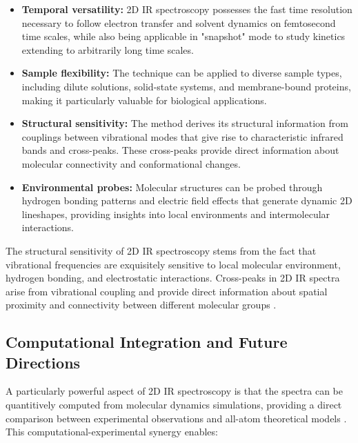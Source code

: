 \begin{itemize}
	\item \textbf{Temporal versatility:} 2D IR spectroscopy possesses the fast time resolution necessary to follow electron transfer and solvent dynamics on femtosecond time scales, while also being applicable in "snapshot" mode to study kinetics extending to arbitrarily long time scales.

	\item \textbf{Sample flexibility:} The technique can be applied to diverse sample types, including dilute solutions, solid-state systems, and membrane-bound proteins, making it particularly valuable for biological applications.

	\item \textbf{Structural sensitivity:} The method derives its structural information from couplings between vibrational modes that give rise to characteristic infrared bands and cross-peaks. These cross-peaks provide direct information about molecular connectivity and conformational changes.

	\item \textbf{Environmental probes:} Molecular structures can be probed through hydrogen bonding patterns and electric field effects that generate dynamic 2D lineshapes, providing insights into local environments and intermolecular interactions.
\end{itemize}

\noindent The structural sensitivity of 2D IR spectroscopy stems from the fact that vibrational frequencies are exquisitely sensitive to local molecular environment, hydrogen bonding, and electrostatic interactions. Cross-peaks in 2D IR spectra arise from vibrational coupling and provide direct information about spatial proximity and connectivity between different molecular groups \cite{hammzanni2011conceptsmethods2d}.

\subsection{Computational Integration and Future Directions}
\label{subsec:computational_integration}

\noindent A particularly powerful aspect of 2D IR spectroscopy is that the spectra can be quantitively computed from molecular dynamics simulations, providing a direct comparison between experimental observations and all-atom theoretical models \cite{hammzanni2011conceptsmethods2d}. This computational-experimental synergy enables:

